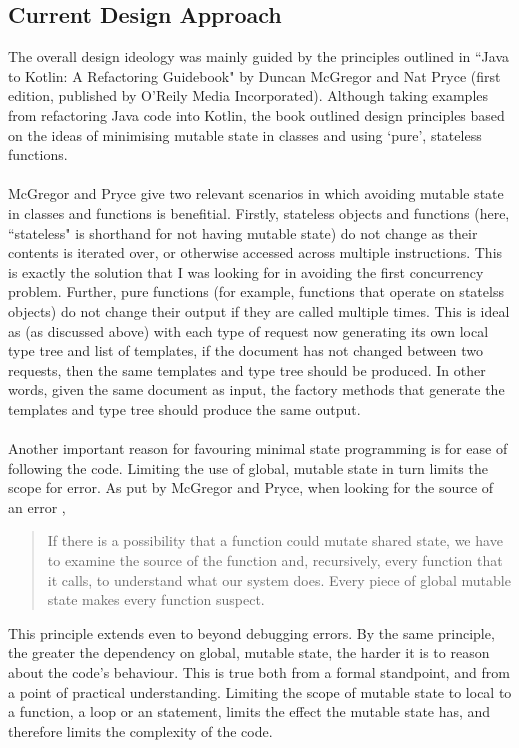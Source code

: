 \documentclass[../main.tex]{subfiles}
\begin{document}
\subsection{Current Design Approach}
The overall design ideology was mainly guided by the principles outlined in ``Java to Kotlin: A Refactoring Guidebook" by Duncan McGregor and Nat Pryce (first edition, published by O'Reily Media Incorporated). Although taking examples from refactoring Java code into Kotlin, the book outlined design principles based on the ideas of minimising mutable state in classes and using `pure', stateless functions. 
\\
\\
McGregor and Pryce give two relevant scenarios in which avoiding mutable state in classes and functions is benefitial. Firstly, stateless objects and functions (here, ``stateless" is shorthand for not having mutable state) do not change as their contents is iterated over, or otherwise accessed across multiple instructions. \cite{java_to_kotlin_stateless} This is exactly the solution that I was looking for in avoiding the first concurrency problem. Further, pure functions (for example, functions that operate on statelss objects) do not change their output if they are called multiple times\cite{java_to_kotlin_pure_functions}. This is ideal as (as discussed above) with each type of request now generating its own local type tree and list of templates, if the document has not changed between two requests, then the same templates and type tree should be produced. In other words, given the same document as input, the factory methods that generate the templates and type tree should produce the same output.
\\
\\
Another important reason for favouring minimal state programming is for ease of following the code. Limiting the use of global, mutable state in turn limits the scope for error. As put by McGregor and Pryce, when looking for the source of an error \cite{java_to_kotlin_error}, 
\begin{quote}
    If there is a possibility that a function could mutate shared state, we have to examine the source of the function and, recursively, every function that it calls, to understand what our system does. Every piece of global mutable state makes every function suspect.
\end{quote}
This principle extends even to beyond debugging errors. By the same principle, the greater the dependency on global, mutable state, the harder it is to reason about the code's behaviour. This is true both from a formal standpoint, and from a point of practical understanding. Limiting the scope of mutable state to local to a function, a  loop or an  statement, limits the effect the mutable state has, and therefore limits the complexity of the code.
\end{document}

